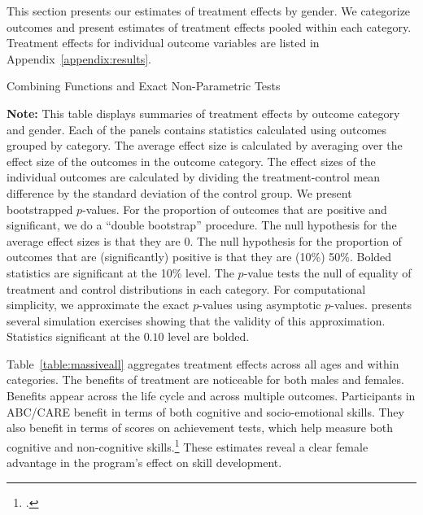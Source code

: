 This section presents our estimates of treatment effects by gender. We categorize outcomes and present estimates of treatment effects pooled within each category. Treatment effects for individual outcome variables are listed in Appendix~\ref{appendix:results}.

\begin{table}[!htpb]
\begin{threeparttable}
\caption{Combining Functions and Exact Non-Parametric Tests} \label{table:massiveall}
\centering
\footnotesize

\begin{tablenotes}
\scriptsize
\item \textbf{Note:} This table displays summaries of treatment effects by outcome category and gender. Each of the panels contains statistics calculated using outcomes grouped by category. The average effect size is calculated by averaging over the effect size of the outcomes in the outcome category. The effect sizes of the individual outcomes are calculated by dividing the treatment-control mean difference by the standard deviation of the control group. We present bootstrapped $p$-values. For the proportion of outcomes that are positive and significant, we do a ``double bootstrap'' procedure. The null hypothesis for the average effect sizes is that they are 0. The null hypothesis for the proportion of outcomes that are (significantly) positive is that they are (10\%) 50\%. Bolded statistics are significant at the 10\% level. The \citet{Rosenbaum_2005_Distribution_JRSS} $p$-value tests the null of equality of treatment and control distributions in each category. For computational simplicity, we approximate the exact $p$-values using asymptotic $p$-values. \citet{Rosenbaum_2005_Distribution_JRSS} presents several simulation exercises showing that the validity of this approximation. Statistics significant at the $0.10$ level are bolded.
\end{tablenotes}
\end{threeparttable}
\end{table}

Table~\ref{table:massiveall} aggregates treatment effects across all ages and within categories. The benefits of treatment are noticeable for both males and females. Benefits appear across the life cycle and across multiple outcomes. Participants in ABC/CARE benefit in terms of both cognitive and socio-emotional skills. They also benefit in terms of scores on achievement tests, which help measure both cognitive and non-cognitive skills.\footnote{\citet{Almlund_Duckworth_etal_2011_ecoval}.} These estimates reveal a clear female advantage in the program's effect on skill development.

